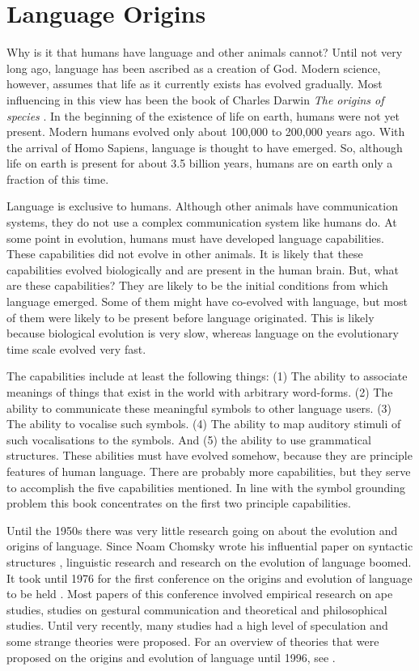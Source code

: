 \section{Language Origins}\label{s:intro:origins}

Why is it that humans have language and other animals cannot? Until not very long ago, language has been ascribed as a creation of God. Modern science, however, assumes that life as it currently exists has evolved gradually. Most influencing in this view has been the book of Charles Darwin {\em The origins of species} \citep{darwin:1968}. In the beginning of the existence of life on earth, humans were not yet present. Modern humans evolved only about 100,000 to 200,000 years ago. With the arrival of Homo Sapiens, language is thought to have emerged. So, although life on earth is present for about 3.5 billion years, humans are on earth only a fraction of this time.


Language is exclusive to humans. Although other animals have communication systems, they do not use a complex communication system like humans do. At some point in evolution, humans must have developed language capabilities. These capabilities did not evolve in other animals. It is likely that these capabilities evolved biologically and are present in the human brain. But, what are these capabilities? They are likely to be the initial conditions from which language emerged. Some of them might have co-evolved with language, but most of them were likely to be present before language originated. This is likely because biological evolution is very slow, whereas language on the evolutionary time scale evolved very fast.

The capabilities include at least the following things: (1) The ability to associate meanings of things that exist in the world with arbitrary word-forms. (2) The ability to communicate these meaningful symbols to other language users. (3) The ability to vocalise such symbols. (4) The ability to map auditory stimuli of such vocalisations to the symbols. And (5) the ability to use grammatical structures. These abilities must have evolved somehow, because they are principle features of human language. There are probably more capabilities, but they serve to accomplish the five capabilities mentioned. In line with the symbol grounding problem this book concentrates on the first two principle capabilities.

Until the 1950s there was very little research going on about the evolution and origins of language. Since Noam Chomsky wrote his influential paper on syntactic structures \citep{chomsky:1956}, linguistic research and research on the evolution of language boomed. It took until 1976 for the first conference on the origins and evolution of language to be held \citep{harnad:1976}. Most papers of this conference involved empirical research on ape studies, studies on gestural communication and theoretical and philosophical studies. Until very recently, many studies had a high level of speculation and some strange theories were proposed. For an overview of theories that were proposed on the origins and evolution of language until 1996, see \citep{aitchison:1996}.

